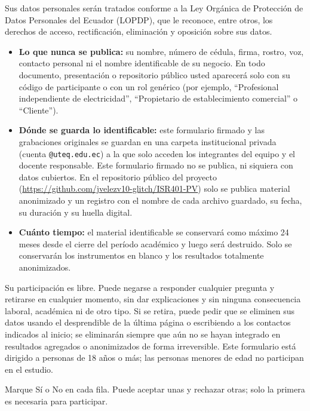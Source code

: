{Sus datos personales ser\'an tratados conforme a la Ley Org\'anica de Protecci\'on de Datos Personales del Ecuador (LOPDP), que le reconoce, entre otros, los derechos de acceso, rectificaci\'on, eliminaci\'on y oposici\'on sobre sus datos.
\begin{itemize}[leftmargin=1.5em, itemsep=4pt, topsep=3pt]
    \item \textbf{Lo que nunca se publica:} su nombre, n\'umero de c\'edula, firma, rostro, voz, contacto personal ni el nombre identificable de su negocio. En todo documento, presentaci\'on o repositorio p\'ublico usted aparecer\'a solo con su c\'odigo de participante o con un rol gen\'erico (por ejemplo, ``Profesional independiente de electricidad'', ``Propietario de establecimiento comercial'' o ``Cliente'').
    \item \textbf{D\'onde se guarda lo identificable:} este formulario firmado y las grabaciones originales se guardan en una carpeta institucional privada (cuenta \texttt{@uteq.edu.ec}) a la que solo acceden los integrantes del equipo y el docente responsable. Este formulario firmado no se publica, ni siquiera con datos cubiertos. En el repositorio p\'ublico del proyecto (\url{https://github.com/jvelezv10-glitch/ISR401-PV}) solo se publica material anonimizado y un registro con el nombre de cada archivo guardado, su fecha, su duraci\'on y su huella digital.
    \item \textbf{Cu\'anto tiempo:} el material identificable se conservar\'a como m\'aximo 24 meses desde el cierre del per\'iodo acad\'emico y luego ser\'a destruido. Solo se conservar\'an los instrumentos en blanco y los resultados totalmente anonimizados.
\end{itemize}


Su participaci\'on es libre. Puede negarse a responder cualquier pregunta y retirarse en cualquier momento, sin dar explicaciones y sin ninguna consecuencia laboral, acad\'emica ni de otro tipo. Si se retira, puede pedir que se eliminen sus datos usando el desprendible de la \'ultima p\'agina o escribiendo a los contactos indicados al inicio; se eliminar\'an siempre que a\'un no se hayan integrado en resultados agregados o anonimizados de forma irreversible. Este formulario est\'a dirigido a personas de 18 a\~nos o m\'as; las personas menores de edad no participan en el estudio.


Marque S\'i o No en cada fila. Puede aceptar unas y rechazar otras; solo la primera es necesaria para participar.
}


